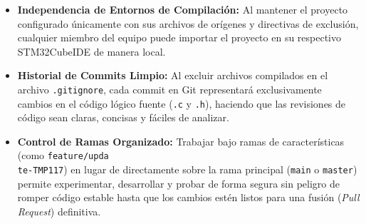 \documentclass[
10pt, %
a4paper, %
oneside, %
headinclude,footinclude, %
BCOR5mm, %
]{scrartcl}
\begin{document}
\begin{itemize}
	\item \textbf{Independencia de Entornos de Compilación:} Al mantener el proyecto configurado únicamente con sus archivos de orígenes y directivas de exclusión, cualquier miembro del equipo puede importar el proyecto en su respectivo STM32CubeIDE de manera local.
	\item \textbf{Historial de Commits Limpio:} Al excluir archivos compilados en el archivo \texttt{.gitignore}, cada commit en Git representará exclusivamente cambios en el código lógico fuente (\texttt{.c} y \texttt{.h}), haciendo que las revisiones de código sean claras, concisas y fáciles de analizar.
	\item \textbf{Control de Ramas Organizado:} Trabajar bajo ramas de características (como \texttt{feature/upda\\te-TMP117}) en lugar de directamente sobre la rama principal (\texttt{main} o \texttt{master}) permite experimentar, desarrollar y probar de forma segura sin peligro de romper código estable hasta que los cambios estén listos para una fusión (\textit{Pull Request}) definitiva.
\end{itemize}
\end{document}
